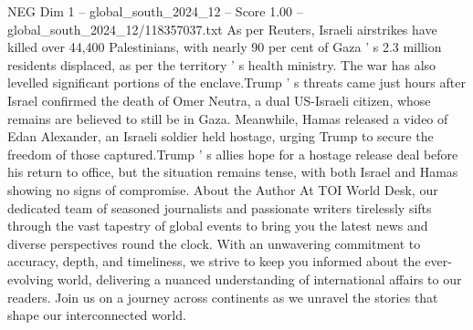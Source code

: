 \begin{textsample}{NEG Dim 1 – global\_south\_2024\_12 – Score 1.00 – global\_south\_2024\_12/118357037.txt}
As per Reuters, Israeli airstrikes have killed over 44,400 Palestinians, with nearly 90 per cent of Gaza ' s 2.3 million residents displaced, as per the territory ' s health ministry.
The war has also levelled significant portions of the enclave.Trump ' s threats came just hours after Israel confirmed the death of Omer Neutra, a dual US-Israeli citizen, whose remains are believed to still be in Gaza.
Meanwhile, Hamas released a video of Edan Alexander, an Israeli soldier held hostage, urging Trump to secure the freedom of those captured.Trump ' s allies hope for a hostage release deal before his return to office, but the situation remains tense, with both Israel and Hamas showing no signs of compromise.
About the Author At TOI World Desk, our dedicated team of seasoned journalists and passionate writers tirelessly sifts through the vast tapestry of global events to bring you the latest news and diverse perspectives round the clock.
With an unwavering commitment to accuracy, depth, and timeliness, we strive to keep you informed about the ever-evolving world, delivering a nuanced understanding of international affairs to our readers.
Join us on a journey across continents as we unravel the stories that shape our interconnected world.

\end{textsample}
